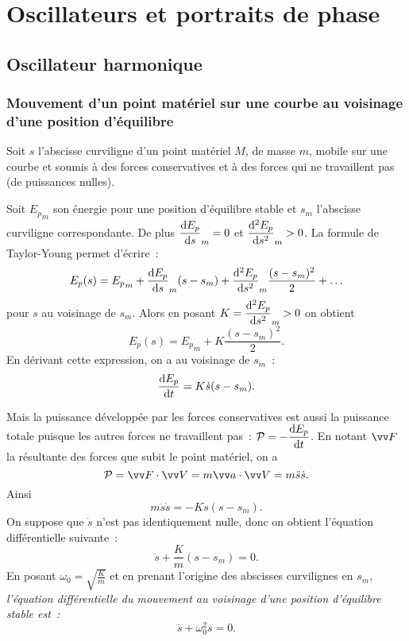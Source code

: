 \chapter{Oscillateurs et portraits de phase}%
\label{chap:oscillateursetportraitdephase}%
\minitoc{}
\minilof{}
\minilot{}

\section{Oscillateur harmonique}%
\label{chap5-sec:oscillateur}%

\subsection{Mouvement d'un point matériel sur une courbe au voisinage d'une 
position d'équilibre}%
\label{chap5-subsec:mvtauvoisinagedunepositiondequilibre}%

Soit \(s\) l'abscisse curviligne d'un point matériel \(M\), de masse \(m\), 
mobile sur une courbe et soumis à des forces conservatives et à des forces qui 
ne travaillent pas (de puissances nulles).

Soit \({E_{p}}_m\) son énergie pour une position d'équilibre stable et \(s_m\) 
l'abscisse curviligne correspondante. De plus \(\dfrac{\mathrm{d} E_p}{\mathrm{d} s}_m=0\) et 
\(\dfrac{\mathrm{d}^2 E_p}{\mathrm{d} {s}^2}_m>0\). La formule de Taylor-Young permet d'écrire~:
\begin{equation}%
  E_p(s) = {E_p}_m + \derived{E_p}{s}_m (s-s_m) + \deriveds{E_p}{s}_m 
  \frac{(s-s_m)^2}{2} + \ldots
\end{equation}%
pour \(s\) au voisinage de \(s_m\). Alors en posant \(K=\dfrac{\mathrm{d}^2 E_p}{\mathrm{d} {s}^2}_m>0\) 
on obtient
\begin{equation}%
  E_p(s) = {E_p}_m + K \frac{(s-s_m)^2}{2}.
\end{equation}%
En dérivant cette expression, on a au voisinage de \(s_m\)~:
\begin{equation}%
  \derived{E_p}{t} = K \dot{s} (s-s_m).
\end{equation}%

Mais la puissance développée par les forces conservatives est aussi la 
puissance totale puisque les autres forces ne travaillent pas~: 
\(\mathcal{P}=-\dfrac{\mathrm{d} E_p}{\mathrm{d} t}\). En notant \(\vF\) la résultante des forces que subit 
le point matériel, on a
\begin{equation}%
  \P = \vF \cdot \vV = m \va \cdot \vV = m\ddot{s} \dot{s}.
\end{equation}%
Ainsi
\begin{equation}%
  m\ddot{s}\dot{s} = -K \dot{s}(s-s_m).
\end{equation}%
On suppose que \(\dot{s}\) n'est pas identiquement nulle, donc on obtient 
l'équation différentielle suivante~:
\begin{equation}%
  \ddot{s} + \frac{K}{m}(s-s_m) = 0.
\end{equation}%
En posant \(\omega_0 = \sqrt{\frac{K}{m}}\) et en prenant l'origine des 
abscisses curvilignes en \(s_m\), \emph{l'équation différentielle du mouvement 
au voisinage d'une position d'équilibre stable est~:}
\begin{equation}%
  \ddot{s} + \omega_0^2 s = 0.
\end{equation}%

